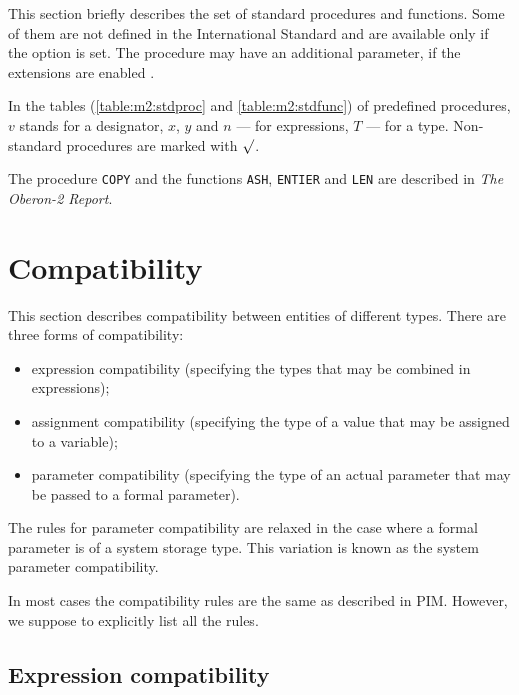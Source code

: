 This section briefly describes the set of
standard procedures and functions. Some of them are not
defined in the International Standard and are
available only if the option  is set.
The procedure  may have
an additional parameter, if the extensions are enabled .

In the tables (\ref{table:m2:stdproc} and
\ref{table:m2:stdfunc}) of predefined procedures, $v$ stands for a
designator, $x$, $y$ and $n$ --- for expressions, $T$ --- for a
type. Non-standard procedures are marked with $\surd$.

The procedure {\tt COPY} and the functions {\tt ASH}, {\tt ENTIER} and
{\tt LEN} are described in {\em The Oberon-2 Report}.      %

\section{Compatibility}\label{m2:ISO:comp}

This section describes compatibility between entities of
different types. There are three forms of compatibility:
\begin{itemize}
\item expression compatibility (specifying the types that may be
      combined in expressions);
\item assignment compatibility (specifying the type of a value
        that may be assigned to a variable);
\item parameter compatibility (specifying the type of an actual
        parameter that may be passed to a formal parameter).
\end{itemize}
The rules for parameter compatibility are relaxed in the case
where a formal parameter is of a system storage type. This
variation is known as the system parameter compatibility.

In most cases the compatibility rules are the same as described
in PIM. However, we suppose to explicitly list all the
rules.

\subsection{Expression compatibility}\label{m2:ISO:comp:expr}

